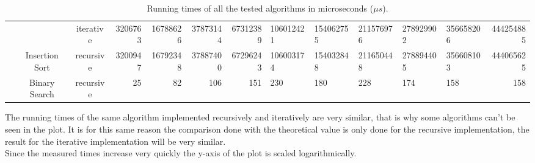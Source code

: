 \documentclass{article}
\begin{document}
\begin{table}[h!]
{\begin{tabular}{l|cc|c|rrrrlllllr|}
 &
  \multicolumn{2}{c|}{\cellcolor[HTML]{67FD9A}} &
  \cellcolor[HTML]{67FD9A}iterative &
  \multicolumn{1}{r|}{\cellcolor[HTML]{67FD9A}3206763} &
  \multicolumn{1}{r|}{\cellcolor[HTML]{67FD9A}16788626} &
  \multicolumn{1}{r|}{\cellcolor[HTML]{67FD9A}37873144} &
  \multicolumn{1}{r|}{\cellcolor[HTML]{67FD9A}67312389} &
  \multicolumn{1}{l|}{\cellcolor[HTML]{67FD9A}106012421} &
  \multicolumn{1}{l|}{\cellcolor[HTML]{67FD9A}154062755} &
  \multicolumn{1}{l|}{\cellcolor[HTML]{67FD9A}211576976} &
  \multicolumn{1}{l|}{\cellcolor[HTML]{67FD9A}278929902} &
  \multicolumn{1}{l|}{\cellcolor[HTML]{67FD9A}356658206} &
  \cellcolor[HTML]{67FD9A}444254885 \\ \cline{4-14} 
 &
  \multicolumn{2}{c|}{\multirow{-2}{*}{\cellcolor[HTML]{67FD9A}Insertion Sort}} &
  \cellcolor[HTML]{67FD9A}recursive &
  \multicolumn{1}{r|}{\cellcolor[HTML]{67FD9A}3200947} &
  \multicolumn{1}{r|}{\cellcolor[HTML]{67FD9A}16792348} &
  \multicolumn{1}{r|}{\cellcolor[HTML]{67FD9A}37887400} &
  \multicolumn{1}{r|}{\cellcolor[HTML]{67FD9A}67296243} &
  \multicolumn{1}{l|}{\cellcolor[HTML]{67FD9A}106003174} &
  \multicolumn{1}{l|}{\cellcolor[HTML]{67FD9A}154032848} &
  \multicolumn{1}{l|}{\cellcolor[HTML]{67FD9A}211650448} &
  \multicolumn{1}{l|}{\cellcolor[HTML]{67FD9A}278894405} &
  \multicolumn{1}{l|}{\cellcolor[HTML]{67FD9A}356608103} &
  \cellcolor[HTML]{67FD9A}444065625 \\ \cline{2-14} 
 &
  \multicolumn{2}{c|}{\cellcolor[HTML]{38FFF8}Binary Search} &
  \cellcolor[HTML]{38FFF8}recursive &
  \multicolumn{1}{r|}{\cellcolor[HTML]{38FFF8}25} &
  \multicolumn{1}{r|}{\cellcolor[HTML]{38FFF8}82} &
  \multicolumn{1}{r|}{\cellcolor[HTML]{38FFF8}106} &
  \multicolumn{1}{r|}{\cellcolor[HTML]{38FFF8}151} &
  \multicolumn{1}{l|}{\cellcolor[HTML]{38FFF8}230} &
  \multicolumn{1}{l|}{\cellcolor[HTML]{38FFF8}180} &
  \multicolumn{1}{l|}{\cellcolor[HTML]{38FFF8}228} &
  \multicolumn{1}{l|}{\cellcolor[HTML]{38FFF8}174} &
  \multicolumn{1}{l|}{\cellcolor[HTML]{38FFF8}158} &
  \cellcolor[HTML]{38FFF8}158 \\ \cline{2-14} 
\end{tabular}}
\caption{Running times of all the tested algorithms in microseconds ($\mu s$).}
\end{table}

The running times of the same algorithm implemented recursively and iteratively are very similar, that is why some algorithms can't be seen in the plot. It is for this same reason the comparison done with the theoretical value is only done for the recursive implementation, the result for the iterative implementation will  be very similar. \\
Since the measured times increase very quickly the y-axis of the plot is scaled logarithmically. 
\end{document}
